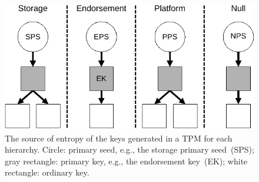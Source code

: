 \begin{figure}[htpb]
  \centering
  \includegraphics[width=0.8\linewidth]{figures/tpm-hierarchies.pdf}
  \caption{The source of entropy of the keys generated in a TPM for each hierarchy. Circle: primary seed, e.g., the storage primary seed~(SPS); gray rectangle: primary key, e.g., the endorsement key~(EK); white rectangle: ordinary key.
  }\label{fig:tpm-hierarchies}
\end{figure}
